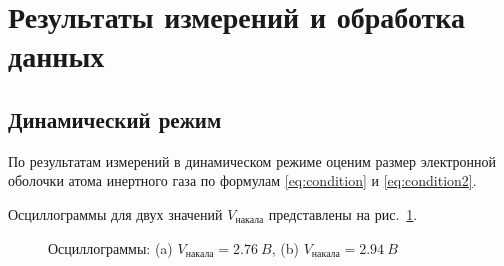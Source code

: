 \documentclass[a4paper, 12pt]{article}
\begin{document}
\section{Результаты измерений и обработка данных}

\subsection{Динамический режим}

По результатам измерений в динамическом режиме оценим размер электронной оболочки атома инертного газа по формулам \eqref{eq:condition} и \eqref{eq:condition2}.

Осциллограммы для двух значений $V_{накала}$ представлены на рис.~\ref{fig:osc}.
\begin{figure}[h]
		\begin{minipage}[h]{0.5\linewidth}
		\end{minipage}
		\hfill
		\begin{minipage}[h]{0.5\linewidth}
		\end{minipage}
		\caption{Осциллограммы: (a) $V_{накала} = 2.76~B$, (b) $V_{накала} = 2.94~B$}
		\label{fig:osc}
\end{figure}
\end{document}
